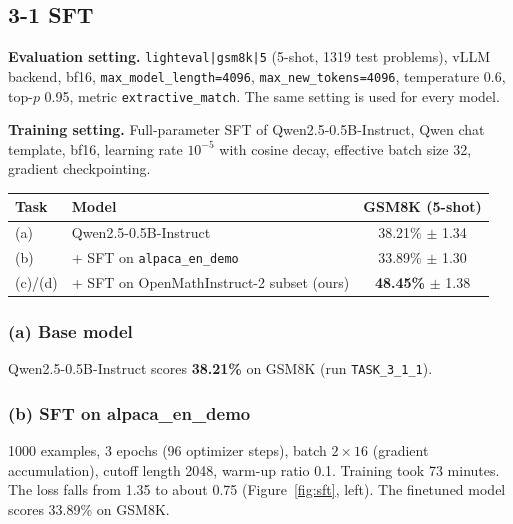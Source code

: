 \documentclass[11pt]{article}
\begin{document}
\subsection*{3-1 SFT}

\textbf{Evaluation setting.} \texttt{lighteval|gsm8k|5} (5-shot, 1319 test problems),
vLLM backend, bf16, \texttt{max\_model\_length=4096},
\texttt{max\_new\_tokens=4096}, temperature 0.6, top-$p$ 0.95, metric
\texttt{extractive\_match}. The same setting is used for every model.

\textbf{Training setting.} Full-parameter SFT of Qwen2.5-0.5B-Instruct, Qwen chat
template, bf16, learning rate $10^{-5}$ with cosine decay, effective batch size 32,
gradient checkpointing.

\begin{center}
\begin{tabular}{llc}
\toprule
Task & Model & GSM8K (5-shot) \\
\midrule
(a) & Qwen2.5-0.5B-Instruct & 38.21\% $\pm$ 1.34 \\
(b) & + SFT on \texttt{alpaca\_en\_demo} & 33.89\% $\pm$ 1.30 \\
(c)/(d) & + SFT on OpenMathInstruct-2 subset (ours) & \textbf{48.45\%} $\pm$ 1.38 \\
\bottomrule
\end{tabular}
\end{center}

\subsubsection*{(a) Base model}
Qwen2.5-0.5B-Instruct scores \textbf{38.21\%} on GSM8K (run \texttt{TASK\_3\_1\_1}).

\subsubsection*{(b) SFT on alpaca\_en\_demo}
1000 examples, 3 epochs (96 optimizer steps), batch $2\times16$ (gradient accumulation),
cutoff length 2048, warm-up ratio 0.1. Training took 73 minutes.
The loss falls from 1.35 to about 0.75 (Figure~\ref{fig:sft}, left).
The finetuned model scores 33.89\% on GSM8K.

\end{document}

